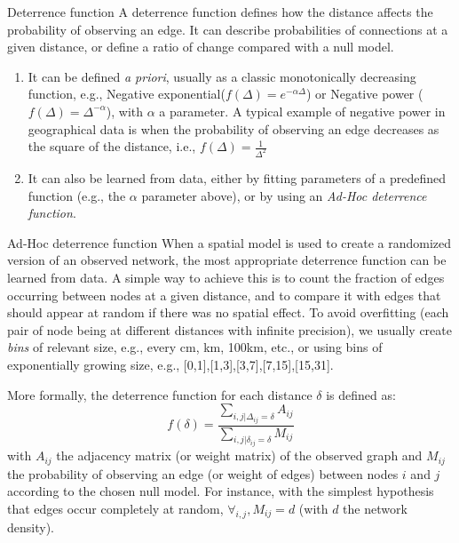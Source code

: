 \documentclass[a4paper,11pt]{book}
\begin{document}
\begin{textbox}{Deterrence function}
A deterrence function defines how the distance affects the probability of observing an edge.
It can describe probabilities of connections at a given distance, or define a ratio of change compared with a null model.

\begin{enumerate}
    \item It can be defined \textit{a priori}, usually as a classic monotonically decreasing function, e.g., Negative exponential($f(\Delta)=e^{-\alpha\Delta}$) or Negative power ($f(\Delta)=\Delta^{-\alpha}$), with $\alpha$ a parameter. A typical example of negative power in geographical data is when the probability of observing an edge decreases as the square of the distance, i.e., $f(\Delta)=\frac{1}{\Delta^2}$
    \item It can also be learned from data, either by fitting parameters of a predefined function (e.g., the $\alpha$ parameter above), or by using an \textit{Ad-Hoc deterrence function}.
\end{enumerate}

\end{textbox}




\begin{textbox}{Ad-Hoc deterrence function}
When a spatial model is used to create a randomized version of an observed network, the most appropriate deterrence function can be learned from data. A simple way to achieve this is to count the fraction of edges occurring between nodes at a given distance, and to compare it with edges that should appear at random if there was no spatial effect. To avoid overfitting (each pair of node being at different distances with infinite precision), we usually create \textit{bins} of relevant size, e.g., every cm, km, 100km, etc., or using bins of exponentially growing size, e.g., {[0,1],[1,3],[3,7],[7,15],[15,31]}.

More formally, the deterrence function for each distance $\delta$ is defined as:
\[
f(\delta)=\frac{\sum_{i,j|\Delta_{ij}=\delta}A_{ij}}{\sum_{i,j|\delta_{ij}=\delta}M_{ij}}
\]
with $A_{ij}$ the adjacency matrix (or weight matrix) of the observed graph and $M_{ij}$ the probability of observing an edge (or weight of edges) between nodes $i$ and $j$ according to the chosen null model. For instance, with the simplest hypothesis that edges occur completely at random, $\forall_{i,j},M_{ij}=d$ (with $d$ the network density).
\end{textbox}
\end{document}

